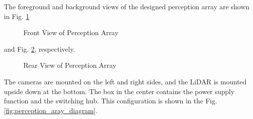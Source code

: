 \documentclass[lettersize,journal]{IEEEtran}
\begin{document}
The foreground and background views of the designed perception array are shown in Fig. \ref{fig:perception_array_front}

\begin{figure}[H]
  \begin{center}
  \end{center}
  \caption{Front View of Perception Array}
  \label{fig:perception_array_front}
\end{figure}

and Fig. \ref{fig:perception_array_back}, respectively.

\begin{figure}[H]
  \begin{center}
  \end{center}
  \caption{Rear View of Perception Array}
  \label{fig:perception_array_back}
\end{figure}

The cameras are mounted on the left and right sides, and the LiDAR is mounted upside down at the bottom.
The box in the center contains the power supply function and the switching hub.
This configuration is shown in the Fig. \ref{fig:perception_aray_diagram}.
\end{document}
